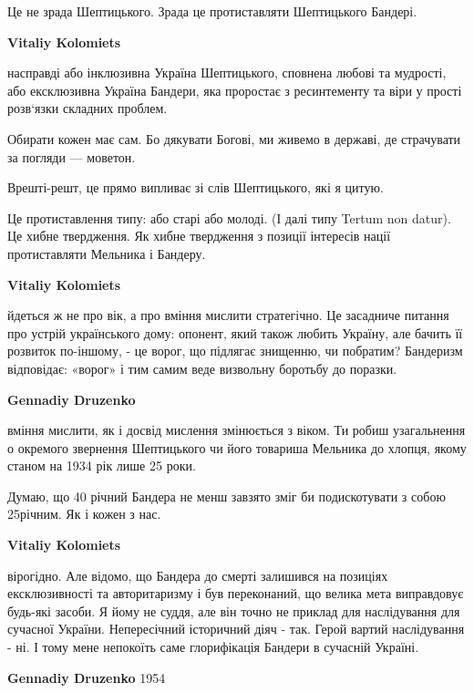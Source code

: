 \begin{itemize}
\begin{itemize}
\end{itemize} %


Це не зрада Шептицького.
Зрада це протиставляти Шептицького Бандері.

\begin{itemize} %
\textbf{Vitaliy Kolomiets} 

насправді або інклюзивна Україна Шептицького, сповнена любові та мудрості, або
ексклюзивна Україна Бандери, яка проростає з ресинтементу та віри у прості
розв‘язки складних проблем.

Обирати кожен має сам. Бо дякувати Богові, ми живемо в державі, де страчувати за погляди — моветон.

Врешті-решт, це прямо випливає зі слів Шептицького, які я цитую.

Це протиставлення типу: або старі або молоді.
(І далі типу Tertum non datur).
Це хибне твердження.
Як хибне твердження з позиції інтересів нації протиставляти Мельника і Бандеру.

\textbf{Vitaliy Kolomiets} 

йдеться ж не про вік, а про вміння мислити стратегічно. Це засадниче питання
про устрій українського дому: опонент, який також любить Україну, але бачить її
розвиток по-іншому, - це ворог, що підлягає знищенню, чи побратим? Бандеризм
відповідає: «ворог» і тим самим веде визвольну боротьбу до поразки.

\textbf{Gennadiy Druzenko} 

вміння мислити, як і досвід мислення змінюється з віком. Ти робиш узагальнення
о окремого звернення Шептицького чи його товариша Мельника до хлопця, якому
станом на 1934 рік лише 25 роки.

Думаю, що 40 річний Бандера не менш завзято зміг би подискотувати з собою
25річним. Як і кожен з нас.

\textbf{Vitaliy Kolomiets} 

вірогідно. Але відомо, що Бандера до смерті залишився на позиціях
ексклюзивності та авторитаризму і був переконаний, що велика мета виправдовує
будь-які засоби. Я йому не суддя, але він точно не приклад для наслідування для
сучасної України. Непересічний історичний діяч - так. Герой вартий наслідування
- ні. І тому мене непокоїть саме глорифікація Бандери в сучасній Україні.

\textbf{Gennadiy Druzenko} 1954


\end{itemize}
\end{itemize}
